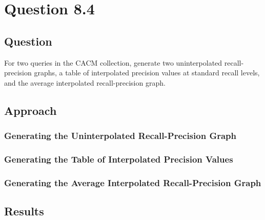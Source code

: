 \section{Question 8.4}


\subsection{Question}
For two queries in the CACM collection, generate two uninterpolated recall-precision graphs, a table of interpolated precision values at standard recall levels, and the average interpolated recall-precision graph.


\subsection{Approach}



\subsubsection{Generating the Uninterpolated Recall-Precision Graph}



\subsubsection{Generating the Table of Interpolated Precision Values}



\subsubsection{Generating the Average Interpolated Recall-Precision Graph}



\subsection{Results}


